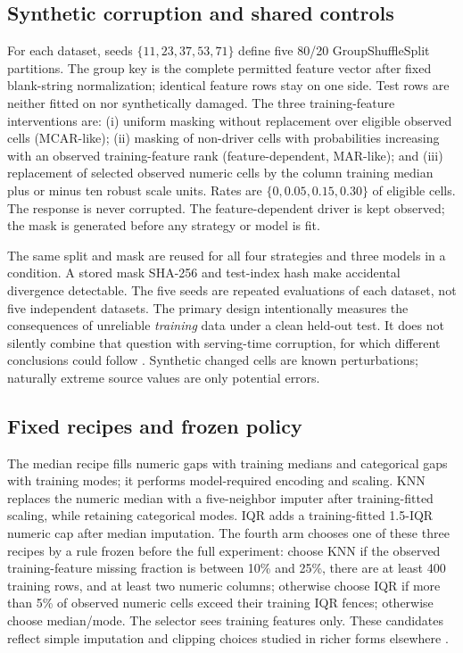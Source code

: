 \documentclass[conference]{IEEEtran}
\begin{document}
\subsection{Synthetic corruption and shared controls}
For each dataset, seeds $\{11,23,37,53,71\}$ define five 80/20 GroupShuffleSplit partitions. The group key is the complete permitted feature vector after fixed blank-string normalization; identical feature rows stay on one side. Test rows are neither fitted on nor synthetically damaged. The three training-feature interventions are: (i) uniform masking without replacement over eligible observed cells (MCAR-like); (ii) masking of non-driver cells with probabilities increasing with an observed training-feature rank (feature-dependent, MAR-like); and (iii) replacement of selected observed numeric cells by the column training median plus or minus ten robust scale units. Rates are $\{0,0.05,0.15,0.30\}$ of eligible cells. The response is never corrupted. The feature-dependent driver is kept observed; the mask is generated before any strategy or model is fit.

The same split and mask are reused for all four strategies and three models in a condition. A stored mask SHA-256 and test-index hash make accidental divergence detectable. The five seeds are repeated evaluations of each dataset, not five independent datasets. The primary design intentionally measures the consequences of unreliable \emph{training} data under a clean held-out test. It does not silently combine that question with serving-time corruption, for which different conclusions could follow \cite{Schelter2021,Mohammed2025}. Synthetic changed cells are known perturbations; naturally extreme source values are only potential errors.

\subsection{Fixed recipes and frozen policy}
The median recipe fills numeric gaps with training medians and categorical gaps with training modes; it performs model-required encoding and scaling. KNN replaces the numeric median with a five-neighbor imputer after training-fitted scaling, while retaining categorical modes. IQR adds a training-fitted 1.5-IQR numeric cap after median imputation. The fourth arm chooses one of these three recipes by a rule frozen before the full experiment: choose KNN if the observed training-feature missing fraction is between 10\% and 25\%, there are at least 400 training rows, and at least two numeric columns; otherwise choose IQR if more than 5\% of observed numeric cells exceed their training IQR fences; otherwise choose median/mode. The selector sees training features only. These candidates reflect simple imputation and clipping choices studied in richer forms elsewhere \cite{Troyanskaya2001,Stekhoven2012,Jarrett2022,Neutatz2022,Jger2024}.
\end{document}
